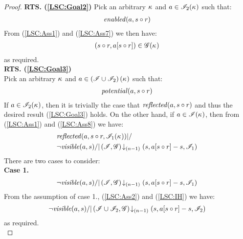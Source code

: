 \begin{lemma}
\begin{proof}
\noindent\textbf{RTS. (\ref{LSC:Goal2})} 
Pick an arbitrary $\kappa_{}$ and $a \in \mathscr{I}_2(\kappa_{})$ such that:
\begin{align}
	\mathit{enabled}(a, s \circ r)\label{LSC:Ass7}
\end{align}
From (\ref{LSC:Ass1}) and (\ref{LSC:Ass7}) we then have:
%
\begin{align*}
	(s \circ r, a[s \circ r]) \in \mathscr{G}(\kappa_{})
\end{align*}
%
as required.\\
%
%
%

\noindent\textbf{RTS. (\ref{LSC:Goal3})}\\
Pick an arbitrary $\kappa_{}$ and $a \in \left(\mathscr{I} \cup \mathscr{I}_2 \right)(\kappa_{})$ such that:
%
\begin{align}
	\mathit{potential}(a, s \circ r)\label{LSC:Ass8}
\end{align}
%
If $a \in \mathscr{I}_2 (\kappa_{})$, then it is trivially the case that $\mathit{reflected}(a, s \circ r)$ and thus the desired result (\ref{LSC:Goal3}) holds. On the other hand, if $a \in \mathscr{I}(\kappa_{})$, then from (\ref{LSC:Ass1}) and (\ref{LSC:Ass8}) we have:
%
\begin{align*}
	& \mathit{reflected}(a, s \circ r, \mathscr{I}_1(\kappa_{})) |/ \\
	& \neg \mathit{visible}(a, s) /| \left(\mathscr{I}, \mathscr{G}\right) \!\downarrow_{(n-1)} \left(s,  a[s \circ r] - s, \mathscr{I}_1\right) 
\end{align*}
%
There are two cases to consider:\\
\noindent\textbf{Case 1.} 
%
\[
\begin{array}{l}
	\neg \mathit{visible}(a, s) /| \left(\mathscr{I}, \mathscr{G}\right) \!\downarrow_{(n-1)} \left(s,  a[s \circ r] - s, \mathscr{I}_1\right)
\end{array}
\]
From the assumption of case 1., (\ref{LSC:Ass2}) and (\ref{LSC:IH}) we have: 
%
\[
\begin{array}{l}
	\neg \mathit{visible}(a, s) /| \left(\mathscr{I} \cup \mathscr{I}_2, \mathscr{G}\right) \!\downarrow_{(n-1)} \left(s,  a[s \circ r] - s, \mathscr{I}_2\right)
\end{array}
\]
as required.\\


\end{proof}
\end{lemma}
